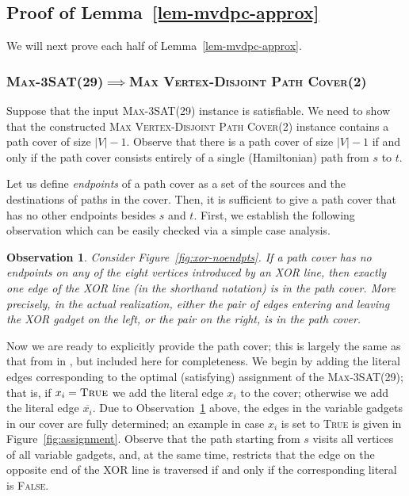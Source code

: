 \documentclass[11pt]{article}
\newtheorem{observation}{Observation}
\begin{document}
\subsection{Proof of Lemma~\ref{lem-mvdpc-approx}} \label{proof-mvdpc-approx}

We will next prove each half of Lemma~\ref{lem-mvdpc-approx}.

\subsubsection*{\textsc{Max-3SAT(29)}$\implies$\textsc{Max Vertex-Disjoint Path Cover(2)}}

Suppose that the input \textsc{Max-3SAT(29)} instance is satisfiable. We need to show that the constructed \textsc{Max Vertex-Disjoint Path Cover(2)} instance contains a path cover of size $|V|-1$. Observe that there is a path cover of size $|V|-1$ if and only if the path cover consists entirely of a single (Hamiltonian) path from $s$ to $t$.

Let us define \emph{endpoints} of a path cover as a set of the sources and the destinations of paths in the cover. Then, it is sufficient to give a path cover that has no other endpoints besides $s$ and $t$. First, we establish the following observation which can be easily checked via a simple case analysis.

\begin{observation} \label{obs-xor}
Consider Figure~\ref{fig:xor-noendpts}. If a path cover has no endpoints on any of the eight vertices introduced by an XOR line, then exactly one edge of the XOR line (in the shorthand notation) is in the path cover. More precisely, in the actual realization, either the pair of edges entering and leaving the XOR gadget on the left, or the pair on the right, is in the path cover.
\end{observation}

Now we are ready to explicitly provide the path cover; this is largely the same as that from in \cite{plesnik}, but included here for completeness. We begin by adding the literal edges corresponding to the optimal (satisfying) assignment of the \textsc{Max-3SAT(29)}; that is, if $x_i = \textsc{True}$ we add the literal edge $x_i$ to the cover; otherwise we add the literal edge $\overline{x_i}$. Due to Observation~\ref{obs-xor} above, the edges in the variable gadgets in our cover are fully determined; an example in case $x_i$ is set to \textsc{True} is given in Figure~\ref{fig:assignment}. Observe that the path starting from $s$ visits all vertices of all variable gadgets, and, at the same time, restricts that the edge on the opposite end of the XOR line is traversed if and only if the corresponding literal is \textsc{False}.
\end{document}
